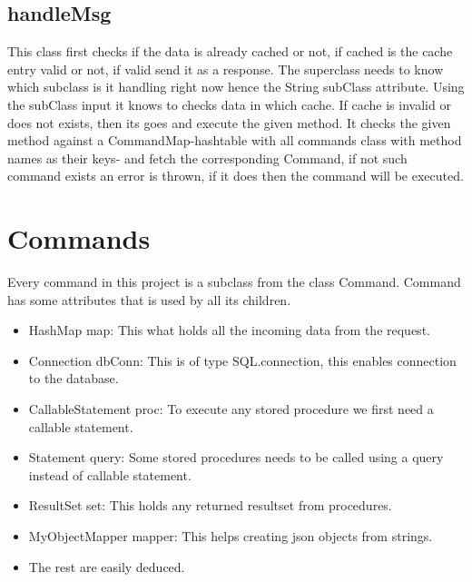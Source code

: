 \documentclass{article}
\begin{document}
\subsection{handleMsg}
This class first checks if the data is already cached or not, if cached is the cache entry valid or not, if valid send it as a response. The superclass needs to know which subclass is it handling right now hence the String subClass attribute. Using the subClass input it knows to checks data in which cache. If cache is invalid or does not exists, then its goes and execute the given method. It checks the given method against a CommandMap-hashtable with all commands class with method names as their keys- and fetch the corresponding Command, if not such command exists an error is thrown, if it does then the command will be executed.

\section{Commands}
Every command in this project is a subclass from the class Command. Command has some attributes that is used by all its children.

    \begin{itemize}
        \item HashMap map: This what holds all the incoming data from the request.
        
        \item Connection dbConn: This is of type SQL.connection, this enables connection to the database.
        
        \item CallableStatement proc: To execute any stored procedure we first need a callable statement.
        
        \item Statement query: Some stored procedures needs to be called using a query instead of callable statement.
        
        \item ResultSet set: This holds any returned resultset from procedures.
        
        \item MyObjectMapper mapper: This helps creating json objects from strings.
        
        \item The rest are easily deduced.
        
    \end{itemize}
    
\end{document}
